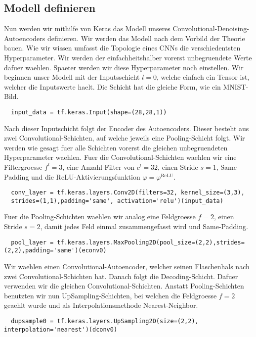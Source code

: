 \subsection{Modell definieren}
Nun werden wir mithilfe von Keras das Modell unseres
Convolutional-Denoising-Autoencoders definieren.
Wir werden das Modell nach dem Vorbild der Theorie bauen.
Wie wir wissen umfasst die Topologie eines CNNs die verschiedentsten
Hyperparameter. Wir werden der einfachheitshalber vorerst unbegruendete Werte
dafuer waehlen. Spaeter werden wir diese Hyperparameter noch einstellen.
\para{}
Wir beginnen unser Modell mit der Inputsschicht $l=0$, welche einfach ein Tensor
ist, welcher die Inputswerte haelt. Die Schicht hat die gleiche Form, wie ein MNIST-Bild.
\begin{verbatim}
  input_data = tf.keras.Input(shape=(28,28,1))
\end{verbatim}
\para{}
Nach dieser Inputschicht folgt der Encoder des Autoencoders. Dieser besteht aus
zwei Convolutional-Schichten, auf welche jeweils eine Pooling-Schicht folgt.
Wir werden wie gesagt fuer alle Schichten vorerst die gleichen unbegruendeten
Hyperparameter waehlen. Fuer die Convolutional-Schichten waehlen wir
eine Filtergroesse $f^l = 3$, eine Anzahl Filter von $c^l = 32$,
einen Stride $s=1$, Same-Padding und die ReLU-Aktivierungsfunktion $\varphi = \varphi^{\text{ReLU}}$.
\begin{verbatim}
  conv_layer = tf.keras.layers.Conv2D(filters=32, kernel_size=(3,3),
  strides=(1,1),padding='same', activation='relu')(input_data)
\end{verbatim}
Fuer die Pooling-Schichten waehlen wir analog eine Feldgroesse $f = 2$, einen
Stride $s = 2$, damit jedes Feld einmal zusammengefasst wird und Same-Padding.
\begin{verbatim}
  pool_layer = tf.keras.layers.MaxPooling2D(pool_size=(2,2),strides=(2,2),padding='same')(econv0)
\end{verbatim}
Wir waehlen einen Convolutional-Autoencoder, welcher seinen Flaschenhals nach
zwei Convolutional-Schichten hat. Danach folgt die Decoding-Schicht.
Dafuer verwenden wir die gleichen Convolutional-Schichten. Anstatt
Pooling-Schichten benutzten wir nun UpSampling-Schichten, bei welchen die
Feldgroesse $f = 2$ geaehlt wurde und als Interpolationsmethode Nearest-Neighbor.
\begin{verbatim}
  dupsample0 = tf.keras.layers.UpSampling2D(size=(2,2), interpolation='nearest')(dconv0)
\end{verbatim}

